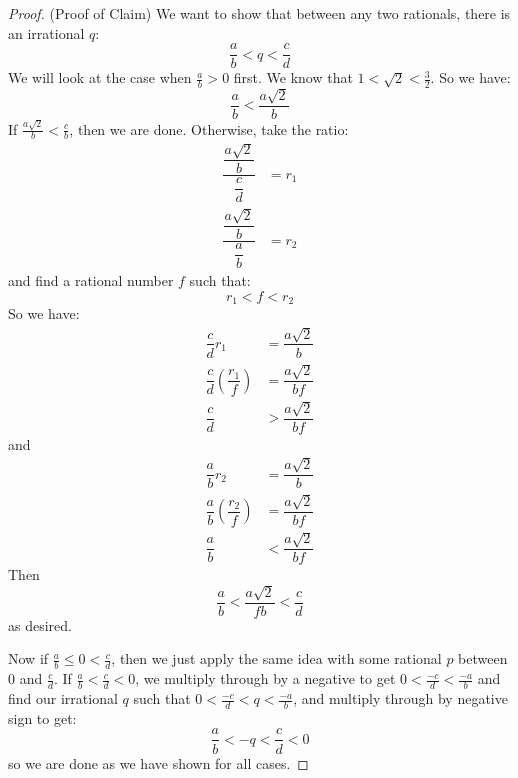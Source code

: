 \documentclass{article}
\begin{document}
\begin{proof}
        (Proof of Claim) We want to show that between any two rationals, there is an irrational $q$:
            \begin{equation*}
                \dfrac{a}{b} < q < \dfrac{c}{d}
            \end{equation*}
        We will look at the case when $\frac{a}{b} > 0$ first. We know that $1 < \sqrt{2} < \frac{3}{2}$. So we have:
            \begin{equation*}
                \dfrac{a}{b} < \dfrac{a\sqrt{2}}{b}
            \end{equation*}
        If $\frac{a\sqrt{2}}{b} < \frac{c}{b}$, then we are done. Otherwise, take the ratio:
            \begin{align*}
                \dfrac{\dfrac{a\sqrt{2}}{b}}{\dfrac{c}{d}} &= r_{1} \\
                \dfrac{\dfrac{a\sqrt{2}}{b}}{\dfrac{a}{b}} &= r_{2}
            \end{align*}
        and find a rational number $f$ such that:
            \begin{equation*}
                r_{1} < f < r_{2}
            \end{equation*}
        So we have:
            \begin{align*}
                \dfrac{c}{d}r_{1}                         &=  \dfrac{a\sqrt{2}}{b}  \\
                \dfrac{c}{d}\left(\dfrac{r_{1}}{f}\right) &=  \dfrac{a\sqrt{2}}{bf} \\
                \dfrac{c}{d}                              &>  \dfrac{a\sqrt{2}}{bf}
            \end{align*}
        and
            \begin{align*}
                \dfrac{a}{b}r_{2}                         &=  \dfrac{a\sqrt{2}}{b}  \\
                \dfrac{a}{b}\left(\dfrac{r_{2}}{f}\right) &=  \dfrac{a\sqrt{2}}{bf} \\
                \dfrac{a}{b}                              &<  \dfrac{a\sqrt{2}}{bf}   
            \end{align*}
        Then 
            \begin{equation*}
                \dfrac{a}{b} < \dfrac{a\sqrt{2}}{fb} < \dfrac{c}{d}
            \end{equation*}
        as desired.

        Now if $\frac{a}{b} \leq  0 < \frac{c}{d}$, then we just apply the same idea with some rational $p$ between $0$ and $\frac{c}{d}$. If $\frac{a}{b} < \frac{c}{d} < 0$, we multiply through by a negative to get $0 < \frac{-c}{d} < \frac{-a}{b}$ and find our irrational $q$ such that $0 < \frac{-c}{d} < q < \frac{-a}{b}$, and multiply through by negative sign to get:
            \begin{equation*}
                \dfrac{a}{b} < -q < \dfrac{c}{d} < 0
            \end{equation*}
        so we are done as we have shown for all cases.
    \end{proof}
\end{document}
